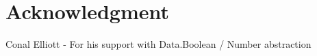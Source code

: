  
\section{Acknowledgment}

Conal Elliott - For his support with Data.Boolean / Number abstraction




